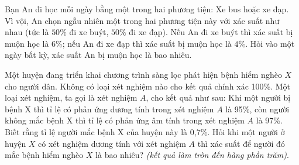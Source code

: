 \begin{bt}%
	Bạn An đi học mỗi ngày bằng một trong  hai phương tiện: Xe bus hoặc xe đạp. Vì vội, An chọn ngẫu nhiên một trong hai phương tiện này với xác suất như nhau (tức là $50\%$ đi xe buýt, $50\%$ đi xe đạp). Nếu An đi xe buýt thì xác suất bị muộn học là $6\%$; nếu An đi xe đạp thì xác suất bị muộn học là $4\%$. Hỏi vào một ngày bất kỳ, xác suất An bị muộn học là bao nhiêu.
\end{bt}

\begin{bt}%
	Một huyện đang triển khai chương trình sàng lọc phát hiện bệnh hiểm nghèo $X$ cho người dân. Không có loại xét nghiệm nào cho kết quả chính xác 100\%. Một loại xét nghiệm, ta gọi là xét nghiệm $A$, cho kết quả như sau: Khi một người  bị bệnh X thì tỉ lệ có phản ứng dương tính trong xét nghiệm $A$ là 95\%, còn người không mắc bệnh X thì tỉ lệ có phản ứng âm tính trong xét nghiệm $A$ là 97\%. Biết rằng tỉ lệ người mắc bệnh X của huyện này là 0{,}7\%. Hỏi khi một người ở huyện $X$ có xét nghiệm dương tính với xét nghiệm $A$ thì xác suất để người đó mắc bệnh hiểm nghèo $X$ là bao nhiêu? \textit{(kết quả làm tròn đến hàng phần trăm)}.
\end{bt}

